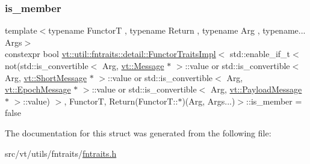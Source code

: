 \subsubsection{\texorpdfstring{is\+\_\+member}{is\_member}}
{\footnotesize\ttfamily template$<$typename FunctorT , typename Return , typename Arg , typename... Args$>$ \\
constexpr bool \hyperlink{structvt_1_1util_1_1fntraits_1_1detail_1_1_functor_traits_impl}{vt\+::util\+::fntraits\+::detail\+::\+Functor\+Traits\+Impl}$<$ std\+::enable\+\_\+if\+\_\+t$<$ not(std\+::is\+\_\+convertible$<$ Arg, \hyperlink{namespacevt_a3a3ddfef40b4c90915fa43cdd5f129ea}{vt\+::\+Message} $\ast$ $>$\+::value or std\+::is\+\_\+convertible$<$ Arg, \hyperlink{namespacevt_a1125ac1da6c0bbf141e0ea0739d7602d}{vt\+::\+Short\+Message} $\ast$ $>$\+::value or std\+::is\+\_\+convertible$<$ Arg, \hyperlink{namespacevt_ad67368ffae52d7325002586b41bb150e}{vt\+::\+Epoch\+Message} $\ast$ $>$\+::value or std\+::is\+\_\+convertible$<$ Arg, \hyperlink{namespacevt_a89a92229c5622b855c02c549f83a1a68}{vt\+::\+Payload\+Message} $\ast$ $>$\+::value) $>$, FunctorT, Return(Functor\+T\+::$\ast$)(Arg, Args...)$>$\+::is\+\_\+member = false\hspace{0.3cm}{\ttfamily [static]}}



The documentation for this struct was generated from the following file\+:\begin{DoxyCompactItemize}
\item 
src/vt/utils/fntraits/\hyperlink{fntraits_8h}{fntraits.\+h}\end{DoxyCompactItemize}

